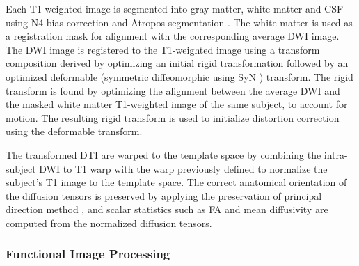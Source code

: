 Each T1-weighted image is segmented into gray matter, white matter and CSF using N4 bias correction \cite{tustison2010} and Atropos segmentation \cite{avants2011a}. The white matter is used as a registration mask for alignment with the corresponding average DWI image. The DWI image is registered to the T1-weighted image using a transform composition derived by optimizing an initial rigid transformation followed by an optimized deformable (symmetric diffeomorphic using SyN \cite{avants2011}) transform. The rigid transform is found by optimizing the alignment between the average DWI and the masked white matter T1-weighted image of the same subject, to account for motion. The resulting rigid transform is used to initialize distortion correction using the deformable transform.

The transformed DTI are warped to the template space by combining the intra-subject DWI to T1 warp with the warp previously defined to normalize the subject's T1 image to the template space. The correct anatomical orientation of the diffusion tensors is preserved by applying the preservation of principal direction method \cite{Alexander2001ITMI}, and scalar statistics such as FA and mean diffusivity are computed from the normalized diffusion tensors.


\subsubsection{Functional Image Processing}

